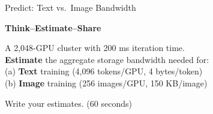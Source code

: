 \documentclass[aspectratio=169, 12pt]{beamer}
\begin{document}
\begin{frame}{Predict: Text vs.\ Image Bandwidth}

\centering
\vspace{0.8cm}
{\Large\bfseries Think--Estimate--Share}

\vspace{0.5cm}
{\large A 2,048-GPU cluster with 200 ms iteration time.\\[0.2cm]
\textbf{Estimate} the aggregate storage bandwidth needed for:\\
(a) \textcolor{datastroke}{\textbf{Text}} training (4,096 tokens/GPU, 4 bytes/token)\\
(b) \textcolor{computestroke}{\textbf{Image}} training (256 images/GPU, 150 KB/image)}

\vspace{0.5cm}
{\normalsize Write your estimates. \textcolor{midgray}{(60 seconds)}}

\end{frame}
\end{document}

